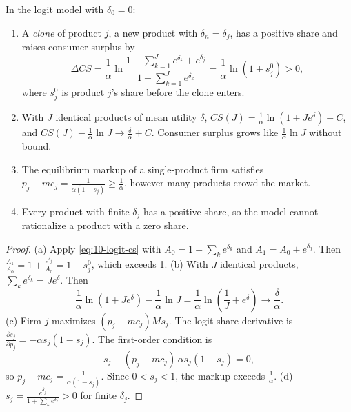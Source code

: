 \begin{proposition}\label{prop:10-clones}
In the logit model with $\delta_0 = 0$:
\begin{enumerate}[label=(\alph*)]
\item A \emph{clone} of product $j$, a new product with $\delta_n = \delta_j$, has a positive share and raises
consumer surplus by
\begin{equation}\label{eq:10-clone-gain}
\Delta CS = \frac{1}{\alpha}\ln\frac{1 + \sum_{k=1}^{J}e^{\delta_k} + e^{\delta_j}}{1 + \sum_{k=1}^{J}e^{\delta_k}}
= \frac{1}{\alpha}\ln\left(1 + s^0_j\right) > 0,
\end{equation}
where $s^0_j$ is product $j$'s share before the clone enters.
\item With $J$ identical products of mean utility $\delta$, $CS(J) = \frac{1}{\alpha}\ln(1 + Je^{\delta}) + C$,
and $CS(J) - \frac{1}{\alpha}\ln J \to \frac{\delta}{\alpha} + C$. Consumer surplus grows like
$\frac{1}{\alpha}\ln J$ without bound.
\item The equilibrium markup of a single-product firm satisfies $p_j - mc_j = \frac{1}{\alpha(1 - s_j)} \ge
\frac{1}{\alpha}$, however many products crowd the market.
\item Every product with finite $\delta_j$ has a positive share, so the model cannot rationalize a product with a
zero share.
\end{enumerate}
\end{proposition}

\begin{proof}
(a) Apply \eqref{eq:10-logit-cs} with $A_0 = 1 + \sum_k e^{\delta_k}$ and $A_1 = A_0 + e^{\delta_j}$. Then
$\frac{A_1}{A_0} = 1 + \frac{e^{\delta_j}}{A_0} = 1 + s^0_j$, which exceeds 1.
(b) With $J$ identical products, $\sum_k e^{\delta_k} = Je^{\delta}$. Then
\begin{equation*}
\frac{1}{\alpha}\ln(1 + Je^{\delta}) - \frac{1}{\alpha}\ln J = \frac{1}{\alpha}\ln\left(\frac{1}{J} + e^{\delta}\right)
\to \frac{\delta}{\alpha}.
\end{equation*}
(c) Firm $j$ maximizes $(p_j - mc_j)Ms_j$. The logit share derivative is $\frac{\partial s_j}{\partial p_j} =
-\alpha s_j(1 - s_j)$. The first-order condition is
\begin{equation*}
s_j - (p_j - mc_j)\,\alpha s_j(1 - s_j) = 0 ,
\end{equation*}
so $p_j - mc_j = \frac{1}{\alpha(1-s_j)}$. Since $0 < s_j < 1$, the markup exceeds $\frac{1}{\alpha}$.
(d) $s_j = \frac{e^{\delta_j}}{1 + \sum_k e^{\delta_k}} > 0$ for finite $\delta_j$.
\end{proof}

